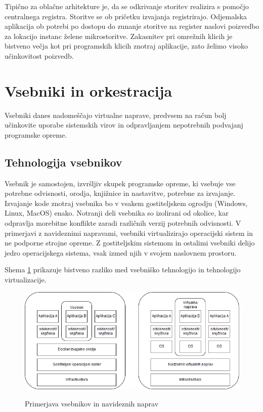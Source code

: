\documentclass[a4paper, 12pt]{book}
\begin{document}
Tipično za oblačne arhitekture je, da se odkrivanje storitev realizira s pomočjo centralnega registra.
Storitve se ob pričetku izvajanja registrirajo.
Odjemalska aplikacija ob potrebi po dostopu do zunanje storitve na register naslovi poizvedbo za lokacijo instanc želene mikrostoritve.
Zakasnitev pri omrežnih klicih je bistveno večja kot pri programskih klicih znotraj aplikacije, zato želimo visoko učinkovitost poizvedb. \cite{serviceDiscovery, maldip}

\section{Vsebniki in orkestracija}

Vsebniki danes nadomeščajo virtualne naprave, predvsem na račun bolj učinkovite uporabe sistemskih virov in odpravljanjem nepotrebnih podvajanj programske opreme.

\subsection{Tehnologija vsebnikov}
Vsebnik je samostojen, izvršljiv skupek programske opreme, ki vsebuje vse potrebne odvisnosti, orodja, knjižnice in nastavitve, potrebne za izvajanje.
Izvajanje kode znotraj vsebnika bo v vsakem gostiteljskem ogrodju (Windows, Linux, MacOS) enako.
Notranji deli vsebnika so izolirani od okolice, kar odpravlja morebitne konflikte zaradi različnih verzij potrebnih odvisnosti.
V primerjavi z navideznimi napravami, vsebniki virtualizirajo operacijski sistem in ne podporne strojne opreme.
Z gostiteljskim sistemom in ostalimi vsebniki delijo jedro operacijskega sistema, vsak izmed njih v svojem naslovnem prostoru.

Shema \ref{vm_vs_container} prikazuje bistveno razliko med vsebniško tehnologijo in tehnologijo virtualizacije. \cite{dockerContainer}

\begin{figure}[h]
	\includegraphics[width=1.0\textwidth]{slike/vsebniki_vm.png}
	\label{vm_vs_container}
	\caption{Primerjava vsebnikov in navideznih naprav}
\end{figure}
\end{document}
